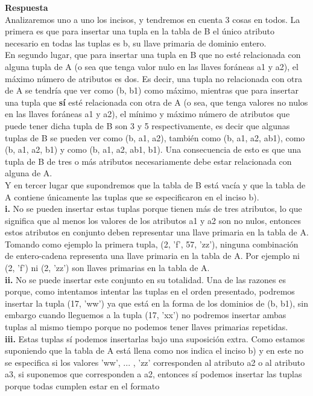 \documentclass[12pt,a4paper]{article}
\begin{document}
\begin{enumerate}
\begin{enumerate}
				\textbf{Respuesta}\\
				Analizaremos uno a uno los incisos, y tendremos en cuenta 3 cosas en todos. La primera es que para insertar una tupla en la tabla de B el único atributo necesario en todas las tuplas es b, su llave primaria de dominio entero. \\
				En segundo lugar, que para insertar una tupla en B que no esté relacionada con alguna tupla de A (o sea que tenga valor nulo en las llaves foráneas a1 y a2), el máximo número de atributos es dos. Es decir, una tupla no relacionada con otra de A se tendría que ver como (b, b1) como máximo, mientras que para insertar una tupla que \textbf{sí} esté relacionada con otra de A (o sea, que tenga valores no nulos en las llaves foráneas a1 y a2), el mínimo y máximo número de atributos que puede tener dicha tupla de B son 3 y 5 respectivamente, es decir que algunas tuplas de B se pueden ver como (b, a1, a2), también como (b, a1, a2, ab1), como (b, a1, a2, b1) y como (b, a1, a2, ab1, b1). Una consecuencia de esto es que una tupla de B de tres o más atributos necesariamente debe estar relacionada con alguna de A.\\
				Y en tercer lugar que supondremos que la tabla de B está vacía y que la tabla de A contiene únicamente las tuplas que se especificaron en el inciso b).\\
				\textbf{i.} No se pueden insertar estas tuplas porque tienen más de tres atributos, lo que significa que al menos los valores de los atributos a1 y a2 son no nulos, entonces estos atributos en conjunto deben representar una llave primaria en la tabla de A. Tomando como ejemplo la primera tupla, (2, 'f', 57, 'zz'), ninguna combinación de entero-cadena representa una llave primaria en la tabla de A. Por ejemplo ni (2, 'f') ni (2, 'zz') son llaves primarias en la tabla de A.\\
				\textbf{ii.} No se puede insertar este conjunto en su totalidad. Una de las razones es porque, como intentamos intentar las tuplas en el orden presentado, podremos insertar la tupla (17, 'ww') ya que está en la forma de los dominios de (b, b1), sin embargo cuando lleguemos a la tupla (17, 'xx') no podremos insertar ambas tuplas al mismo tiempo porque no podemos tener llaves primarias repetidas.\\
				\textbf{iii.} Estas tuplas sí podemos insertarlas bajo una suposición extra. Como estamos suponiendo que la tabla de A está llena como nos indica el inciso b) y en este no se especifica si los valores 'ww', ... , 'zz' corresponden al atributo a2 o al atributo a3, si suponemos que corresponden a a2, entonces sí podemos insertar las tuplas porque todas cumplen estar en el formato\\

\end{enumerate}
\end{enumerate}
\end{document}
